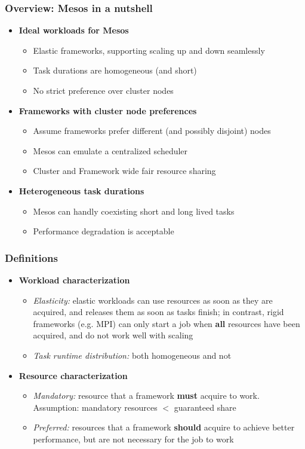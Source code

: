 \begin{frame}
\frametitle{Overview: Mesos in a nutshell}
\begin{itemize}
	\item {\bf Ideal workloads for Mesos}
	\begin{itemize}
		\item Elastic frameworks, supporting scaling up and down seamlessly
		\item Task durations are homogeneous (and short)
		\item No strict preference over cluster nodes
	\end{itemize}
	\item {\bf Frameworks with cluster node preferences}
	\begin{itemize}
		\item Assume frameworks prefer different (and possibly disjoint) nodes
		\item Mesos can emulate a centralized scheduler
		\item Cluster and Framework wide fair resource sharing
	\end{itemize}
	\item {\bf Heterogeneous task durations}
	\begin{itemize}
		\item Mesos can handly coexisting short and long lived tasks
		\item Performance degradation is acceptable
	\end{itemize}
\end{itemize}
\end{frame}

\begin{frame}
\frametitle{Definitions}
\begin{itemize}
	\item {\bf Workload characterization}
	\begin{itemize}
		\item {\it Elasticity:} elastic workloads can use resources as soon as they are acquired, and releases them as soon as tasks finish; in contrast, rigid frameworks (e.g. MPI) can only start a job when {\bf all} resources have been acquired, and do not work well with scaling
		\item {\it Task runtime distribution:} both homogeneous and not
	\end{itemize}
	\item {\bf Resource characterization}
	\begin{itemize}
		\item {\it Mandatory:} resource that a framework {\bf must} acquire to work. Assumption: mandatory resources $<$ guaranteed share
		\item {\it Preferred:} resources that a framework {\bf should} acquire to achieve better performance, but are not necessary for the job to work
	\end{itemize}
\end{itemize}
\end{frame}

